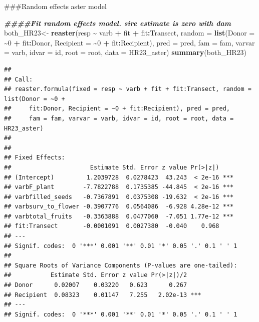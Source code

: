 \documentclass[
]{article}
\newenvironment{Shaded}{\begin{snugshade}}{\end{snugshade}}
\newcommand{\AttributeTok}[1]{\textcolor[rgb]{0.13,0.29,0.53}{#1}}
\newcommand{\DecValTok}[1]{\textcolor[rgb]{0.00,0.00,0.81}{#1}}
\newcommand{\DocumentationTok}[1]{\textcolor[rgb]{0.56,0.35,0.01}{\textbf{\textit{#1}}}}
\newcommand{\FunctionTok}[1]{\textcolor[rgb]{0.13,0.29,0.53}{\textbf{#1}}}
\newcommand{\NormalTok}[1]{#1}
\newcommand{\OtherTok}[1]{\textcolor[rgb]{0.56,0.35,0.01}{#1}}
\newcommand{\SpecialCharTok}[1]{\textcolor[rgb]{0.81,0.36,0.00}{\textbf{#1}}}
\begin{document}
\#\#\#Random effects aster model

\begin{Shaded}
\begin{Highlighting}[]
\DocumentationTok{\#\#\#\#Fit random effects model. sire estimate is zero with dam  }
\NormalTok{both\_HR23}\OtherTok{\textless{}{-}} \FunctionTok{reaster}\NormalTok{(resp }\SpecialCharTok{\textasciitilde{}}\NormalTok{ varb }\SpecialCharTok{+}\NormalTok{ fit }\SpecialCharTok{+}\NormalTok{ fit}\SpecialCharTok{:}\NormalTok{Transect, }\AttributeTok{random =} \FunctionTok{list}\NormalTok{(}\AttributeTok{Donor =} \SpecialCharTok{\textasciitilde{}}\DecValTok{0} \SpecialCharTok{+} 
\NormalTok{    fit}\SpecialCharTok{:}\NormalTok{Donor, }\AttributeTok{Recipient =} \SpecialCharTok{\textasciitilde{}}\DecValTok{0} \SpecialCharTok{+}\NormalTok{ fit}\SpecialCharTok{:}\NormalTok{Recipient), }\AttributeTok{pred =}\NormalTok{ pred, }\AttributeTok{fam =}\NormalTok{ fam, }\AttributeTok{varvar =}\NormalTok{ varb, }
    \AttributeTok{idvar =}\NormalTok{ id, }\AttributeTok{root =}\NormalTok{ root, }\AttributeTok{data =}\NormalTok{ HR23\_aster)}
\FunctionTok{summary}\NormalTok{(both\_HR23)}
\end{Highlighting}
\end{Shaded}

\begin{verbatim}
## 
## Call:
## reaster.formula(fixed = resp ~ varb + fit + fit:Transect, random = list(Donor = ~0 + 
##     fit:Donor, Recipient = ~0 + fit:Recipient), pred = pred, 
##     fam = fam, varvar = varb, idvar = id, root = root, data = HR23_aster)
## 
## 
## Fixed Effects:
##                      Estimate Std. Error z value Pr(>|z|)    
## (Intercept)         1.2039728  0.0278423  43.243  < 2e-16 ***
## varbF_plant        -7.7822788  0.1735385 -44.845  < 2e-16 ***
## varbfilled_seeds   -0.7367891  0.0375308 -19.632  < 2e-16 ***
## varbsurv_to_flower -0.3907776  0.0564086  -6.928 4.28e-12 ***
## varbtotal_fruits   -0.3363888  0.0477060  -7.051 1.77e-12 ***
## fit:Transect       -0.0001091  0.0027380  -0.040    0.968    
## ---
## Signif. codes:  0 '***' 0.001 '**' 0.01 '*' 0.05 '.' 0.1 ' ' 1
## 
## Square Roots of Variance Components (P-values are one-tailed):
##           Estimate Std. Error z value Pr(>|z|)/2    
## Donor      0.02007    0.03220   0.623      0.267    
## Recipient  0.08323    0.01147   7.255   2.02e-13 ***
## ---
## Signif. codes:  0 '***' 0.001 '**' 0.01 '*' 0.05 '.' 0.1 ' ' 1
\end{verbatim}
\end{document}

